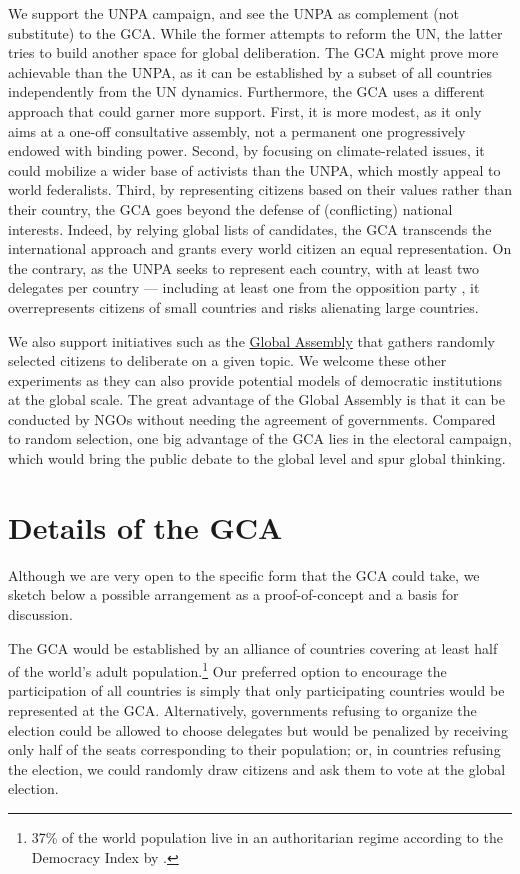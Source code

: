 \documentclass[12pt,english]{article}
\begin{document}
We support the UNPA campaign, and see the UNPA as complement (not substitute) to the GCA. While the former attempts to reform the UN, the latter tries to build another space for global deliberation. The GCA might prove more achievable than the UNPA, as it can be established by a subset of all countries independently from the UN dynamics. Furthermore, the GCA uses a different approach that could garner more support. First, it is more modest, as it only aims at a one-off consultative assembly, not a permanent one progressively endowed with binding power. Second, by focusing on climate-related issues, it could mobilize a wider base of activists than the UNPA, which mostly appeal to world federalists.  Third, by representing citizens based on their values rather than their country, the GCA goes beyond the defense of (conflicting) national interests. Indeed, by relying global lists of candidates, the GCA transcends the international approach and grants every world citizen an equal representation. On the contrary, as the UNPA seeks to represent each country, with at least two delegates per country --- including at least one from the opposition party \citep{leinen_world_2018}, it overrepresents citizens of small countries and risks alienating large countries. 

We also support initiatives such as the \href{https://globalassembly.org/}{Global Assembly} that gathers randomly selected citizens to deliberate on a given topic. We welcome these other experiments as they can also provide potential models of democratic institutions at the global scale. The great advantage of the Global Assembly is that it can be conducted by NGOs without needing the agreement of governments. Compared to random selection, one big advantage of the GCA lies in the electoral campaign, which would bring the public debate to the global level and spur global thinking.%


\section{Details of the GCA}\label{sec:details}

Although we are very open to the specific form that the GCA could take, we sketch below a possible arrangement as a proof-of-concept and a basis for discussion. 

The GCA would be established by an alliance of countries covering at least half of the world's adult population.\footnote{37\% of the world population live in an authoritarian regime according to the Democracy Index by \citet{eiu_democracy_2022}.} 
Our preferred option to encourage the participation of all countries is simply that only participating countries would be represented at the GCA. Alternatively,  governments refusing to organize the election could be allowed to choose delegates but would be penalized by receiving only half of the seats corresponding to their population; or, in countries refusing the election, we could randomly draw citizens and ask them to vote at the global election. 
\end{document}
